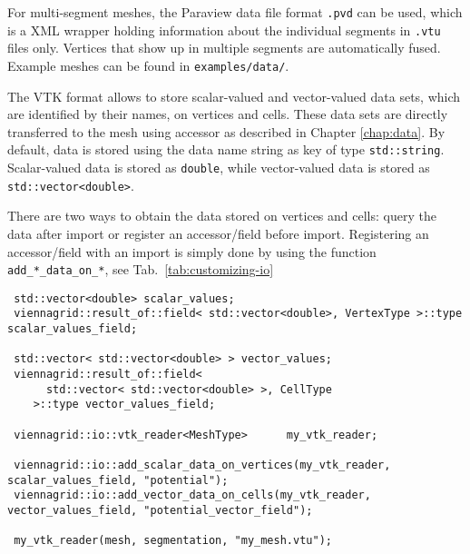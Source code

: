  For multi-segment meshes, the Paraview \cite{paraview} data file format \lstinline|.pvd| can be used, which is a XML wrapper holding information about the individual segments in \lstinline|.vtu| files only. Vertices that show up in multiple segments are automatically fused. Example meshes can be found in \texttt{examples/data/}.


 The VTK format allows to store scalar-valued and vector-valued data sets, which are identified by their names, on vertices and cells.
 These data sets are directly transferred to the {\ViennaGrid} mesh using accessor as described in Chapter \ref{chap:data}.
 By default, data is stored using the data name string as key of type \lstinline|std::string|.
 Scalar-valued data is stored as \lstinline|double|, while vector-valued data is stored as \lstinline|std::vector<double>|.


There are two ways to obtain the data stored on vertices and cells: query the data after import or register an accessor/field before import.
Registering an accessor/field with an import is simply done by using the function \lstinline|add_*_data_on_*|, see Tab.~\ref{tab:customizing-io}

 \begin{lstlisting}
 std::vector<double> scalar_values;
 viennagrid::result_of::field< std::vector<double>, VertexType >::type scalar_values_field;

 std::vector< std::vector<double> > vector_values;
 viennagrid::result_of::field<
      std::vector< std::vector<double> >, CellType
    >::type vector_values_field;

 viennagrid::io::vtk_reader<MeshType>      my_vtk_reader;

 viennagrid::io::add_scalar_data_on_vertices(my_vtk_reader, scalar_values_field, "potential");
 viennagrid::io::add_vector_data_on_cells(my_vtk_reader, vector_values_field, "potential_vector_field");

 my_vtk_reader(mesh, segmentation, "my_mesh.vtu");
 \end{lstlisting}



